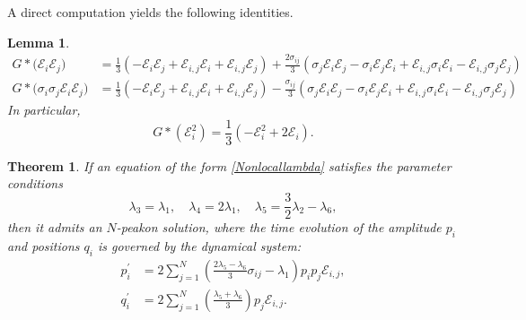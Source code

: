 \documentclass[11pt]{article}
\newtheorem{theorem}{Theorem}
\newtheorem{lemma}{Lemma}
\begin{document}
A direct computation yields the following identities.

\begin{lemma}\label{lemma1}
\begin{equation}
\begin{aligned}
    G\ast \Big( \mathcal{E}_i\mathcal{E}_j\Big) & = \frac 13 (  -\mathcal{E}_i \mathcal{E}_j+\mathcal{E}_{i,j}\mathcal{E}_i + \mathcal{E}_{i,j}\mathcal{E}_j) + \frac{2\sigma_{ij}}{3}(\sigma_j\mathcal{E}_i\mathcal{E}_j -\sigma_i\mathcal{E}_j\mathcal{E}_i+\mathcal{E}_{i,j}\sigma_i\mathcal{E}_i - \mathcal{E}_{i,j}\sigma_j\mathcal{E}_j  )\\
    G\ast \Big( \sigma_i\sigma_j\mathcal{E}_i\mathcal{E}_j\Big) & =  \frac 13 (  -\mathcal{E}_i \mathcal{E}_j+\mathcal{E}_{i,j}\mathcal{E}_i + \mathcal{E}_{i,j}\mathcal{E}_j) - \frac{\sigma_{ij}}{3}(\sigma_j\mathcal{E}_i\mathcal{E}_j -\sigma_i\mathcal{E}_j\mathcal{E}_i+\mathcal{E}_{i,j}\sigma_i\mathcal{E}_i - \mathcal{E}_{i,j}\sigma_j\mathcal{E}_j  )
\end{aligned}
\end{equation}
In particular,
\begin{equation}
 G\ast (\mathcal{E}_i^2) = \frac{1}{3}(-\mathcal{E}_{i}^2 +2\mathcal{E}_{i}).
\end{equation}
\end{lemma}


 
\begin{theorem}\label{theorem1}
    If an equation of the form \eqref{Nonlocallambda} satisfies the parameter conditions
    \begin{equation*}
    \lambda_3 = \lambda_1,\quad \lambda_4 = 2\lambda_1,\quad \lambda_5 = \frac32\lambda_2 - \lambda_6,
    \end{equation*}
    then it admits an $N$-peakon solution, where the time evolution of the amplitude $p_i$ and positions $q_i$ is governed by the dynamical system:
\begin{equation}\label{ODEsystems}
\begin{aligned}
    p_i^\prime &= 2\sum_{j=1}^N \left( \frac{2\lambda_5 - \lambda_6}{3}\sigma_{ij} - \lambda_1\right) p_i p_j \mathcal{E}_{i,j}, \\
    q_i^\prime &= 2\sum_{j=1}^N  \left( \frac{\lambda_5 + \lambda_6}{3} \right) p_j\mathcal{E}_{i,j}.
\end{aligned}
\end{equation}
\end{theorem}
\end{document}
